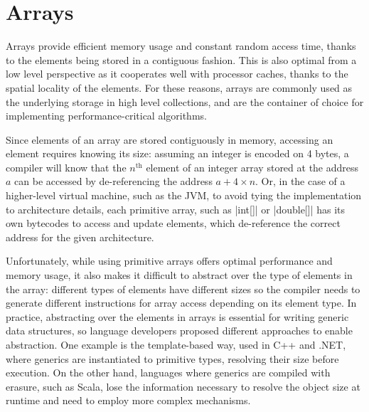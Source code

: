 \section{Arrays}
\label{sec:mbarrays}

Arrays provide efficient memory usage and constant random access time, thanks to the elements being stored in a contiguous fashion. This is also optimal from a low level perspective as it cooperates well with processor caches, thanks to the spatial locality of the elements. For these reasons, arrays are commonly used as the underlying storage in high level collections, and are the container of choice for implementing performance-critical algorithms.

Since elements of an array are stored contiguously in memory, accessing an element requires knowing its size: assuming an integer is encoded on 4 bytes, a compiler will know that the $n^\text{th}$ element of an integer array stored at the address $a$ can be accessed by de-referencing the address $a + 4 \times n$. Or, in the case of a higher-level virtual machine, such as the JVM, to avoid tying the implementation to architecture details, each primitive array, such as |int[]| or |double[]| has its own bytecodes to access and update elements, which de-reference the correct address for the given architecture.


Unfortunately, while using primitive arrays offers optimal performance and memory usage, it also makes it difficult to abstract over the type of elements in the array: different types of elements have different sizes so the compiler needs to generate different instructions for array access depending on its element type. In practice, abstracting over the elements in arrays is essential for writing generic data structures, so language developers proposed different approaches to enable abstraction. One example is the template-based way, used in C++ and .NET, where generics are instantiated to primitive types, resolving their size before execution. On the other hand, languages where generics are compiled with erasure, such as Scala, lose the information necessary to resolve the object size at runtime and need to employ more complex mechanisms.

